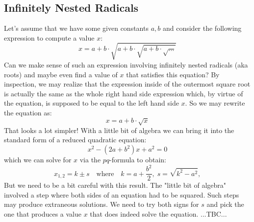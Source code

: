 \subsection{Infinitely Nested Radicals}
Let's assume that we have some given constants $a,b$ and consider the following expression to compute a value $x$:
\begin{equation}
 x = a + b \cdot \sqrt{a + b \cdot \sqrt{a + b \cdot \sqrt{\ldots}}}
\end{equation}
Can we make sense of such an expression involving infinitely nested radicals (aka roots) and maybe even find a value of $x$ that satisfies this equation? By inspection, we may realize that the expression inside of the outermost square root is actually the same as the whole right hand side expression which, by virtue of the equation, is supposed to be equal to the left hand side $x$. So we may rewrite the equation as:
\begin{equation}
 x = a + b \cdot \sqrt{x}
\end{equation}
That looks a lot simpler! With a little bit of algebra we can bring it into the standard form of a reduced quadratic equation:
\begin{equation}
x^2 - (2a + b^2) x + a^2 = 0
\end{equation}
which we can solve for $x$ via the $pq$-formula to obtain:
\begin{equation}
x_{1,2} = k \pm s 
\quad \text{where} \quad
k = a + \frac{b^2}{2}, \;
s = \sqrt{k^2 - a^2}, 
\end{equation}
But we need to be a bit careful with this result. The "little bit of algebra" involved a step where both sides of an equation had to be squared. Such steps may produce extraneous solutions. We need to try both signs for $s$ and pick the one that produces a value $x$ that does indeed solve the equation. ...TBC...





